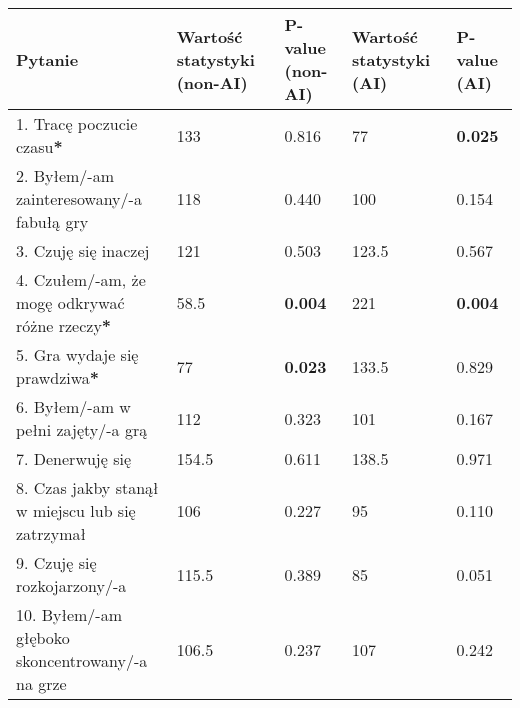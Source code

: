 \begin{table}[h!]
    \begin{center}
        \begin{tabular}{|m{10em}|m{5em}|m{5em}|m{5em}|m{5em}|}
            \hline
            Pytanie                                                           & Wartość statystyki (non-AI) & P-value (non-AI) & Wartość statystyki (AI) & P-value (AI)   \\
            \hline
            1. Tracę poczucie czasu\textbf{*}                                 & 133                         & 0.816            & 77                      & \textbf{0.025} \\
            2. Byłem/-am \newline zainteresowany/-a fabułą gry                & 118                         & 0.440            & 100                     & 0.154          \\
            3. Czuję się inaczej                                              & 121                         & 0.503            & 123.5                   & 0.567          \\
            4. Czułem/-am, że mogę odkrywać różne rzeczy\textbf{*}            & 58.5                        & \textbf{0.004}   & 221                     & \textbf{0.004} \\
            5. Gra wydaje się prawdziwa\textbf{*}                             & 77                          & \textbf{0.023}   & 133.5                   & 0.829          \\
            6. Byłem/-am \newline w pełni zajęty/-a grą                       & 112                         & 0.323            & 101                     & 0.167          \\
            7. Denerwuję się                                                  & 154.5                       & 0.611            & 138.5                   & 0.971          \\
            8. Czas jakby stanął w miejscu lub się zatrzymał                  & 106                         & 0.227            & 95                      & 0.110          \\
            9. Czuję się \newline rozkojarzony/-a                             & 115.5                       & 0.389            & 85                      & 0.051          \\
            10. Byłem/-am głęboko \newline skoncentrowany/-a \newline na grze & 106.5                       & 0.237            & 107                     & 0.242          \\

\end{tabular}
\end{center}
\end{table}
